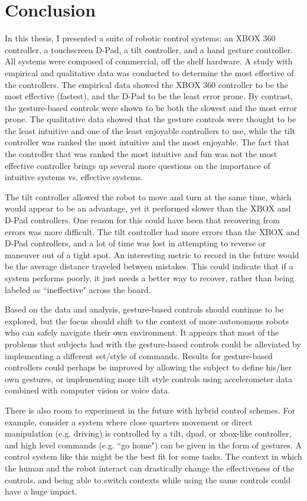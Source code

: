 \documentclass[12pt, letterpaper]{report}
\begin{document}
\chapter{Conclusion}
In this thesis, I presented a suite of robotic control systems: an XBOX 360 controller, a touchscreen D-Pad, a tilt controller, and a hand gesture controller. All systems were composed of commercial, off the shelf hardware. A study with empirical and qualitative data was conducted to determine the most effective of the controllers. The empirical data showed the XBOX 360 controller to be the most effective (fastest), and the D-Pad to be the least error prone. By contrast, the gesture-based controls were shown to be both the slowest and the most error prone. The qualitative data showed that the gesture controls were thought to be the least intuitive and one of the least enjoyable controllers to use, while the tilt controller was ranked the most intuitive and the most enjoyable. The fact that the controller that was ranked the most intuitive and fun was not the most effective controller brings up several more questions on the importance of intuitive systems vs. effective systems. 

The tilt controller allowed the robot to move and turn at the same time, which would appear to be an advantage, yet it performed slower than the XBOX and D-Pad controllers. One reason for this could have been that recovering from errors was more difficult. The tilt controller had more errors than the XBOX and D-Pad controllers, and a lot of time was lost in attempting to reverse or maneuver out of a tight spot. An interesting metric to record in the future would be the average distance traveled between mistakes. This could indicate that if a system performs poorly, it just needs a better way to recover, rather than being labeled as ``ineffective" across the board.

Based on the data and analysis, gesture-based controls should continue to be explored, but the focus should shift to the context of more autonomous robots who can safely navigate their own environment. It appears that most of the problems that subjects had with the gesture-based controls could be alleviated by implementing a different set/style of commands. Results for gesture-based controllers could perhaps be improved by allowing the subject to define his/her own gestures, or implementing more tilt style controls using accelerometer data combined with computer vision or voice data.

There is also room to experiment in the future with hybrid control schemes. For example, consider a system where close quarters movement or direct manipulation (e.g. driving) is controlled by a tilt, dpad, or xbox-like controller, and high level commands (e.g. ``go home") can be given in the form of gestures. A control system like this might be the best fit for some tasks. The context in which the human and the robot interact can drastically change the effectiveness of the controls, and being able to switch contexts while using the same controls could have a huge impact.
\end{document}
